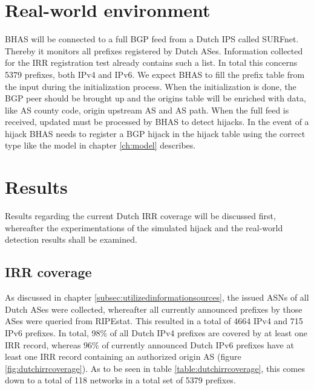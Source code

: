 \section{Real-world environment}\label{sec:realworldenvironment}
BHAS will be connected to a full BGP feed from a Dutch IPS called SURFnet. Thereby it monitors all prefixes registered by Dutch ASes. Information collected for the IRR registration test already contains such a list. In total this concerns 5379 prefixes, both IPv4 and IPv6. We expect BHAS to fill the prefix table from the input during the initialization process. When the initialization is done, the BGP peer should be brought up and the origins table will be enriched with data, like AS county code,  origin upstream AS and AS path. When the full feed is received, updated must be processed by BHAS to detect hijacks. In the event of a hijack BHAS needs to register a BGP hijack in the hijack table using the correct type like the model in chapter \ref{ch:model} describes. \par

\section{Results}\label{sec:results}
Results regarding the current Dutch IRR coverage will be discussed first, whereafter the experimentations of the simulated hijack and the real-world detection results shall be examined.

\subsection{IRR coverage}\label{subsec:irrcoverage}
As discussed in chapter \ref{subsec:utilizedinformationsources}, the issued ASNs of all Dutch ASes were collected, whereafter all currently announced prefixes by those ASes were queried from RIPEstat. This resulted in a total of 4664 IPv4 and 715 IPv6 prefixes. In total, 98\% of all Dutch IPv4 prefixes are covered by at least one IRR record, whereas 96\% of currently announced Dutch IPv6 prefixes have at least one IRR record containing an authorized origin AS (figure \ref{fig:dutchirrcoverage}). As to be seen in table \ref{table:dutchirrcoverage}, this comes down to a total of 118 networks in a total set of 5379 prefixes.

